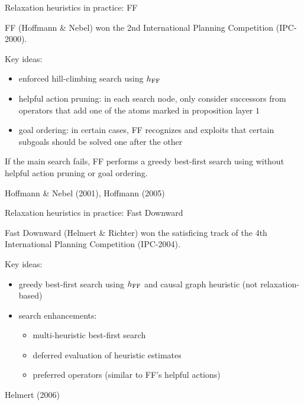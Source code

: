 \documentclass{gkibeamer}
\begin{document}
\begin{frame}{Relaxation heuristics in practice: FF}
  \begin{example}[FF]
    \alert{FF} (Hoffmann \& Nebel) won the 2nd International Planning
    Competition (IPC-2000).

    \smallskip

    Key ideas:
    \begin{itemize}
    \item \alert{enforced hill-climbing} search using \alert{$h_{\text{FF}}$}
    \item \alert{helpful action pruning:} in each search node, only
      consider successors from operators that add one of the atoms
      marked in proposition layer $1$
    \item \alert{goal ordering:} in certain cases, FF recognizes and
      exploits that certain subgoals should be solved one after the
      other
    \end{itemize}
    If the main search fails, FF performs a greedy best-first search
    using {\hff} without helpful action pruning or goal ordering.
  \end{example}
   Hoffmann \& Nebel (2001), Hoffmann (2005)
\end{frame}

\begin{frame}{Relaxation heuristics in practice: Fast Downward}
  \begin{example}
    \alert{Fast Downward} (Helmert \& Richter) won the satisficing
    track of the 4th International Planning Competition (IPC-2004).

    \smallskip
    
    Key ideas:
    \begin{itemize}
    \item \alert{greedy best-first search} using \alert{$h_{\text{FF}}$} and
      \alert{causal graph heuristic} (not relaxation-based)
    \item search enhancements:
      \begin{itemize}
      \item multi-heuristic best-first search
      \item deferred evaluation of heuristic estimates
      \item preferred operators (similar to FF's helpful actions)
      \end{itemize}
    \end{itemize}
  \end{example}
   Helmert (2006)
\end{frame}
\end{document}
